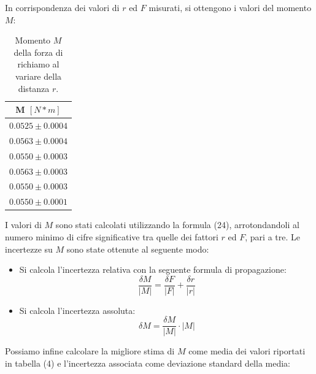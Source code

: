In corrispondenza dei valori di $r$ ed $F$ misurati, si ottengono i valori del momento $M$:

\begin{table}[H]
	\centering
	\begin{tabular}{|c|}
		\hline
		\textbf{M $[N*m]$} \\
		\hline
		$0.0525\pm 0.0004$ \\
		$0.0563\pm 0.0004$ \\
		$0.0550\pm 0.0003$ \\
		$0.0563\pm 0.0003$ \\
		$0.0550\pm 0.0003$ \\
            $0.0550 \pm 0.0001$ \\
		\hline
	\end{tabular}
	\caption{Momento $M$ della forza di richiamo al variare della distanza $r$.}
	\label{tab:}
\end{table}

I valori di $M$ sono stati calcolati utilizzando la formula (24), arrotondandoli al numero minimo di cifre significative tra quelle dei fattori $r$ ed $F$, pari a tre. Le incertezze su $M$ sono state ottenute al seguente modo:
\begin{itemize}
    \item Si calcola l'incertezza relativa con la seguente formula di propagazione: 
    \begin{equation}
        \frac{\delta M}{|M|} = \frac{\delta F}{|F|} + \frac{\delta r}{|r|}
    \end{equation}
    \item Si calcola l'incertezza assoluta:
    \begin{equation}
        \delta M = \frac{\delta M}{|M|} \cdot |M|
    \end{equation}
\end{itemize}

Possiamo infine calcolare la migliore stima di $M$ come media dei valori riportati in tabella (4) e l'incertezza associata come deviazione standard della media:

